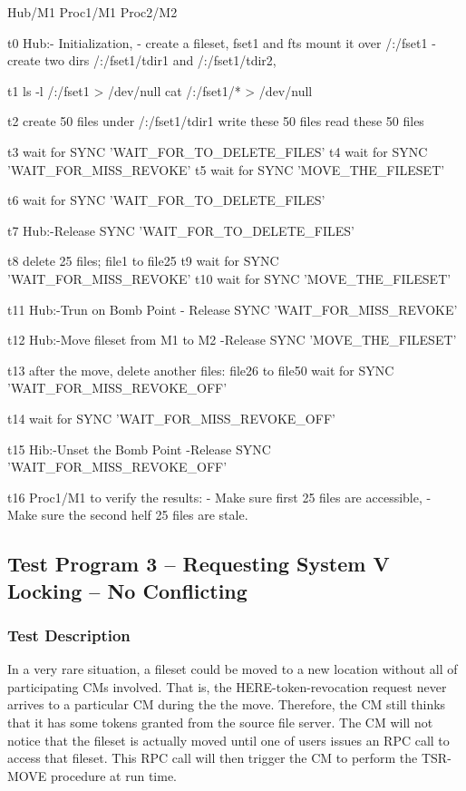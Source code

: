 \begin{programexample}

    Hub/M1		Proc1/M1			Proc2/M2
	 	 
t0  Hub:- Initialization,
	- create a fileset, fset1 and fts mount it over /:/fset1
	- create two dirs /:/fset1/tdir1 and /:/fset1/tdir2, 

t1							ls -l /:/fset1  > /dev/null
							cat /:/fset1/* > /dev/null

t2			create 50 files under 
			/:/fset1/tdir1
			write these 50 files
			read these 50 files

t3			wait for SYNC 'WAIT_FOR_TO_DELETE_FILES'
t4			wait for SYNC 'WAIT_FOR_MISS_REVOKE'
t5			wait for SYNC 'MOVE_THE_FILESET'


t6							wait for SYNC 'WAIT_FOR_TO_DELETE_FILES'


t7  Hub:-Release SYNC 'WAIT_FOR_TO_DELETE_FILES'

t8							delete 25 files; file1 to file25
t9							wait for SYNC 'WAIT_FOR_MISS_REVOKE'
t10							wait for SYNC 'MOVE_THE_FILESET'


t11 Hub:-Trun on Bomb Point
	- Release SYNC 'WAIT_FOR_MISS_REVOKE'

t12 Hub:-Move fileset from M1 to M2
	-Release SYNC 'MOVE_THE_FILESET'

t13							after the move,
							delete another files: file26 to file50
							wait for SYNC 'WAIT_FOR_MISS_REVOKE_OFF'

t14			wait for SYNC 'WAIT_FOR_MISS_REVOKE_OFF'

t15 Hib:-Unset the Bomb Point
	-Release SYNC 'WAIT_FOR_MISS_REVOKE_OFF'

t16			Proc1/M1 to verify the results:
			- Make sure first 25 files are accessible,
			- Make sure the second helf 25 files are stale.


\end{programexample}

\pagebreak 
\subsection {Test Program 3 -- Requesting System V Locking -- No Conflicting}

\subsubsection {Test Description}

In a very rare situation, a fileset could be moved to a new location
without all of participating CMs involved. That is, the HERE-token-revocation
request never arrives to a particular CM during the the move. Therefore, the
CM still thinks that it has some tokens granted from the source file server.
The CM will not notice that the fileset is actually moved until one of users
issues an RPC call to access that fileset. This RPC call will then trigger 
the CM to perform the TSR-MOVE procedure at run time. 
 
